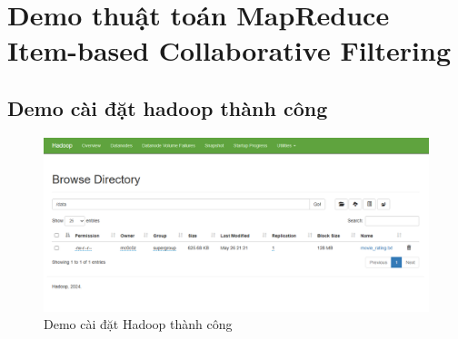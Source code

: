 \pagebreak
\section{Demo thuật toán MapReduce Item-based Collaborative Filtering}
\subsection*{Demo cài đặt hadoop thành công}
\begin{figure}[h]
    \centering
    \includegraphics[width=12cm]{images/Demo1.png}
    \caption{Demo cài đặt Hadoop thành công}
\end{figure}
